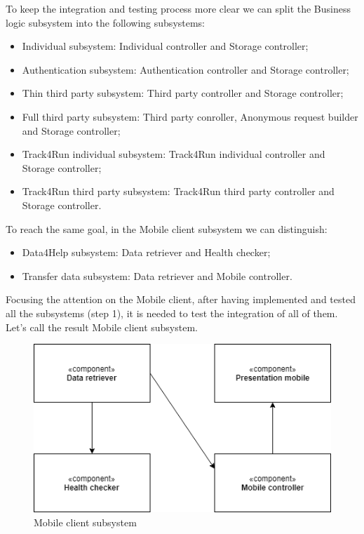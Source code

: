 To keep the integration and testing process more clear we can split the Business logic subsystem into the following subsystems:
	\begin{itemize}
	\item Individual subsystem: Individual controller and Storage controller;
	\item Authentication subsystem: Authentication controller and Storage controller;
	\item Thin third party subsystem: Third party controller and Storage controller;
	\item Full third party subsystem: Third party conroller, Anonymous request builder and Storage controller;
	\item Track4Run individual subsystem: Track4Run individual controller and Storage controller;
	\item Track4Run third party subsystem: Track4Run third party controller and Storage controller.\\
	\end{itemize}

To reach the same goal, in the Mobile client subsystem we can distinguish:
	\begin{itemize}
	\item Data4Help subsystem: Data retriever and Health checker;
	\item Transfer data subsystem: Data retriever and Mobile controller.\\
	\end{itemize}

Focusing the attention on the Mobile client, after having implemented and tested all the subsystems (step 1), it is needed to test the integration of all of them. Let's call the result Mobile client subsystem.
	\begin{figure}[H]
	\includegraphics[scale=0.5, center] {images/integration/mobileClient.png}
	\caption {Mobile client subsystem}
	\end{figure}
	
